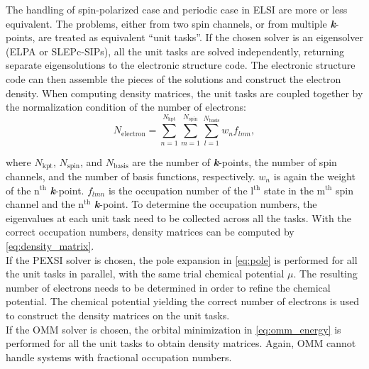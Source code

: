 \documentclass{report}
\begin{document}
The handling of spin-polarized case and periodic case in ELSI are more or less equivalent.  The problems, either from two spin channels, or from multiple \textbf{\textit{k}}-points, are treated as equivalent ``unit tasks''.  If the chosen solver is an eigensolver (ELPA or SLEPc-SIPs), all the unit tasks are solved independently, returning separate eigensolutions to the electronic structure code.  The electronic structure code can then assemble the pieces of the solutions and construct the electron density.  When computing density matrices, the unit tasks are coupled together by the normalization condition of the number of electrons:\\
\begin{equation}
\label{eq:normalization}
N_\text{electron} = \sum_{n=1}^{N_\text{kpt}} \sum_{m=1}^{N_\text{spin}} \sum_{l=1}^{N_\text{basis}} w_n f_{lmn} ,
\end{equation}

\noindent where $N_\text{kpt}$, $N_\text{spin}$, and $N_\text{basis}$ are the number of \textbf{\textit{k}}-points, the number of spin channels, and the number of basis functions, respectively.  $w_n$ is again the weight of the n$^\text{th}$ \textbf{\textit{k}}-point.  $f_{lmn}$ is the occupation number of the l$^\text{th}$ state in the m$^\text{th}$ spin channel and the n$^\text{th}$ \textbf{\textit{k}}-point.  To determine the occupation numbers, the eigenvalues at each unit task need to be collected across all the tasks.  With the correct occupation numbers, density matrices can be computed by \ref{eq:density_matrix}.\\

If the PEXSI solver is chosen, the pole expansion in \ref{eq:pole} is performed for all the unit tasks in parallel, with the same trial chemical potential $\mu$.  The resulting number of electrons needs to be determined in order to refine the chemical potential.  The chemical potential yielding the correct number of electrons is used to construct the density matrices on the unit tasks.\\

If the OMM solver is chosen, the orbital minimization in \ref{eq:omm_energy} is performed for all the unit tasks to obtain density matrices.  Again, OMM cannot handle systems with fractional occupation numbers.\\
\end{document}
